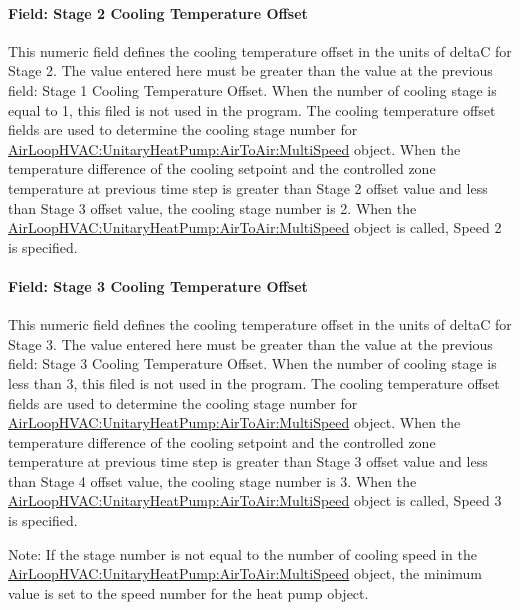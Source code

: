 \paragraph{Field: Stage 2 Cooling Temperature Offset}\label{field-stage-2-cooling-temperature-offset}

This numeric field defines the cooling temperature offset in the units of deltaC for Stage 2. The value entered here must be greater than the value at the previous field: Stage 1 Cooling Temperature Offset. When the number of cooling stage is equal to 1, this filed is not used in the program. The cooling temperature offset fields are used to determine the cooling stage number for \hyperref[airloophvacunitaryheatpumpairtoairmultispeed]{AirLoopHVAC:UnitaryHeatPump:AirToAir:MultiSpeed} object. When the temperature difference of the cooling setpoint and the controlled zone temperature at previous time step is greater than Stage 2 offset value and less than Stage 3 offset value, the cooling stage number is 2. When the \hyperref[airloophvacunitaryheatpumpairtoairmultispeed]{AirLoopHVAC:UnitaryHeatPump:AirToAir:MultiSpeed} object is called, Speed 2 is specified.

\paragraph{Field: Stage 3 Cooling Temperature Offset}\label{field-stage-3-cooling-temperature-offset}

This numeric field defines the cooling temperature offset in the units of deltaC for Stage 3. The value entered here must be greater than the value at the previous field: Stage 3 Cooling Temperature Offset. When the number of cooling stage is less than 3, this filed is not used in the program. The cooling temperature offset fields are used to determine the cooling stage number for \hyperref[airloophvacunitaryheatpumpairtoairmultispeed]{AirLoopHVAC:UnitaryHeatPump:AirToAir:MultiSpeed} object. When the temperature difference of the cooling setpoint and the controlled zone temperature at previous time step is greater than Stage 3 offset value and less than Stage 4 offset value, the cooling stage number is 3. When the \hyperref[airloophvacunitaryheatpumpairtoairmultispeed]{AirLoopHVAC:UnitaryHeatPump:AirToAir:MultiSpeed} object is called, Speed 3 is specified.

Note: If the stage number is not equal to the number of cooling speed in the \hyperref[airloophvacunitaryheatpumpairtoairmultispeed]{AirLoopHVAC:UnitaryHeatPump:AirToAir:MultiSpeed} object, the minimum value is set to the speed number for the heat pump object.

